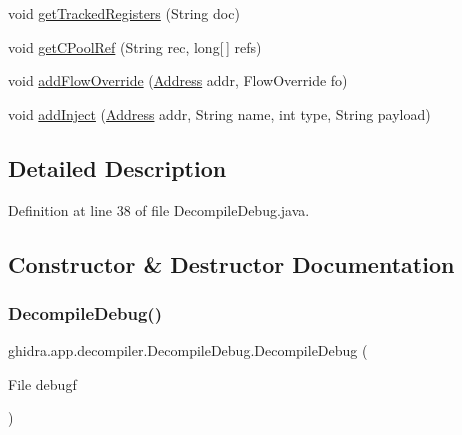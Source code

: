 \begin{DoxyCompactItemize}
void \mbox{\hyperlink{classghidra_1_1app_1_1decompiler_1_1_decompile_debug_a31db2fa005425108a5cbca58049f48ae}{get\+Tracked\+Registers}} (String doc)
\item 
void \mbox{\hyperlink{classghidra_1_1app_1_1decompiler_1_1_decompile_debug_ad15cca2c42d67c2c541cf17619cef018}{get\+C\+Pool\+Ref}} (String rec, long\mbox{[}$\,$\mbox{]} refs)
\item 
void \mbox{\hyperlink{classghidra_1_1app_1_1decompiler_1_1_decompile_debug_ab047b61fe9aa3497e61db0bfcab314f1}{add\+Flow\+Override}} (\mbox{\hyperlink{class_address}{Address}} addr, Flow\+Override fo)
\item 
void \mbox{\hyperlink{classghidra_1_1app_1_1decompiler_1_1_decompile_debug_a7163633c8aa4444a1fc36fff80482428}{add\+Inject}} (\mbox{\hyperlink{class_address}{Address}} addr, String name, int type, String payload)
\end{DoxyCompactItemize}


\subsection{Detailed Description}


Definition at line 38 of file Decompile\+Debug.\+java.



\subsection{Constructor \& Destructor Documentation}
\mbox{\label{classghidra_1_1app_1_1decompiler_1_1_decompile_debug_a01d165ce7cf1a7eb23f6443bd7368a7f}} 
\subsubsection{\texorpdfstring{DecompileDebug()}{DecompileDebug()}}
{\footnotesize\ttfamily ghidra.\+app.\+decompiler.\+Decompile\+Debug.\+Decompile\+Debug (\begin{DoxyParamCaption}\item[{File}]{debugf }\end{DoxyParamCaption})\hspace{0.3cm}{\ttfamily [inline]}}




